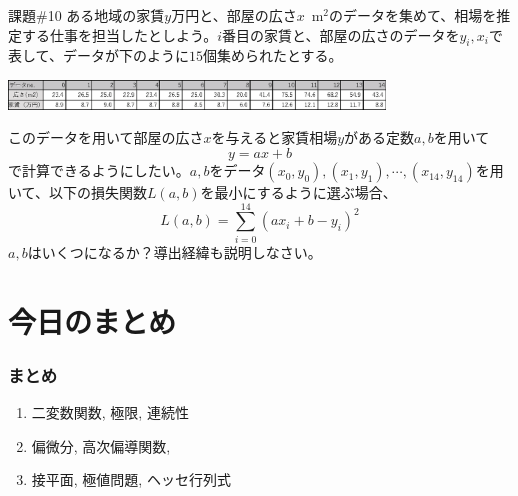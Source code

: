 \begin{slide}{課題\#10}
ある地域の家賃$y$万円と、部屋の広さ$x$~$\mathrm{m^2}$のデータを集めて、相場を推定する仕事を担当したとしよう。$i$番目の家賃と、部屋の広さのデータを$y_i, x_i$で表して、データが下のように$15$個集められたとする。
\begin{table}[hbt]
\centering 
\includegraphics[width=10cm]{calculus10/renttab.eps}
\label{tab:renttab}
\end{table}
このデータを用いて部屋の広さ$x$を与えると家賃相場$y$がある定数$a, b$を用いて
\begin{equation}
y = a x + b \nonumber
\label{eq:regsimple}
\end{equation}
で計算できるようにしたい。$a,b$をデータ$(x_0, y_0), (x_1, y_1), \cdots, (x_{14}, y_{14})$を用いて、以下の損失関数$L(a,b)$を最小にするように選ぶ場合、
\begin{equation}
L(a, b) = \sum_{i=0}^{14} \left(a x_i + b - y_i\right)^2 \nonumber 
\end{equation}
$a, b$はいくつになるか？導出経緯も説明しなさい。




\end{slide}

\section{今日のまとめ}
\begin{frame}
\frametitle{まとめ}   


\begin{enumerate}
\item 二変数関数, 極限, 連続性
\item 偏微分, 高次偏導関数,
\item 接平面, 極値問題, ヘッセ行列式
\end{enumerate} 

\end{frame}
